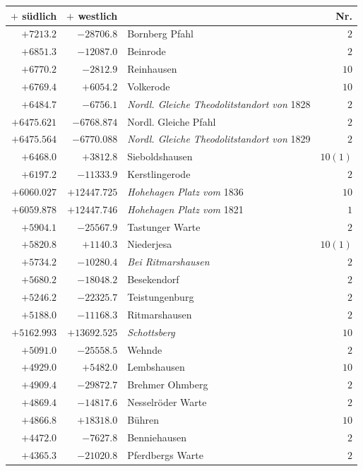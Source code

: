 \clearpage{}%
\begin{center}\begingroup\fontsize{8}{9}\selectfont
\setlength{\tabcolsep}{4pt}
\begin{tabular}{r|r|p{170pt}|r}\hline
\(+\) südlich&\(+\) westlich&&Nr.\\\hline
\(+7213.2\)&\(-28706.8\)&Bornberg Pfahl&\(2\)\\
\(+6851.3\)&\(-12087.0\)&Beinrode&\(2\)\\
\(+6770.2\)&\(-2812.9\)&Reinhausen&\(10\)\\
\(+6769.4\)&\(+6054.2\)&Volkerode&\(10\)\\
\(+6484.7\)&\(-6756.1\)&\textit{Nordl. Gleiche Theodolitstandort von} 1828&\(2\)\\
\(+6475.621\)&\(-6768.874\)&Nordl. Gleiche Pfahl&\(2\)\\
\(+6475.564\)&\(-6770.088\)&\textit{Nordl. Gleiche Theodolitstandort von} 1829&\(2\)\\
\(+6468.0\)&\(+3812.8\)&Sieboldshausen&\(10(1)\)\\
\(+6197.2\)&\(-11333.9\)&Kerstlingerode&\(2\)\\
\(+6060.027\)&\(+12447.725\)&\textit{Hohehagen Platz vom} 1836&\(10\)\\
\(+6059.878\)&\(+12447.746\)&\textit{Hohehagen Platz vom} 1821&\(1\)\\
\(+5904.1\)&\(-25567.9\)&Tastunger Warte&\(2\)\\
\(+5820.8\)&\(+1140.3\)&Niederjesa&\(10(1)\)\\
\(+5734.2\)&\(-10280.4\)&\textit{Bei Ritmarshausen}&\(2\)\\
\(+5680.2\)&\(-18048.2\)&Besekendorf&\(2\)\\
\(+5246.2\)&\(-22325.7\)&Teistungenburg&\(2\)\\
\(+5188.0\)&\(-11168.3\)&Ritmarshausen&\(2\)\\
\(+5162.993\)&\(+13692.525\)&\textit{Schottsberg}&\(10\)\\
\(+5091.0\)&\(-25558.5\)&Wehnde&\(2\)\\
\(+4929.0\)&\(+5482.0\)&Lembshausen&\(10\)\\
\(+4909.4\)&\(-29872.7\)&Brehmer Ohmberg&\(2\)\\
\(+4869.4\)&\(-14817.6\)&Nesselröder Warte&\(2\)\\
\(+4866.8\)&\(+18318.0\)&Bühren&\(10\)\\
\(+4472.0\)&\(-7627.8\)&Benniehausen&\(2\)\\
\(+4365.3\)&\(-21020.8\)&Pferdbergs Warte&\(2\)\\

\end{tabular}
\end{center}
